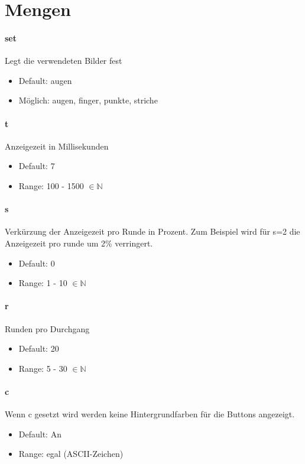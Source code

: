 \documentclass[]{article}
\begin{document}
\section{Mengen}
\begin{multicols}{2}

	\paragraph{set}  Legt die verwendeten Bilder fest
	\begin{itemize}
		\item Default:  augen
		\item Möglich:  augen, finger, punkte, striche
	\end{itemize}

	\paragraph{t} Anzeigezeit in Millisekunden

	\begin{itemize}
		\item Default:  7
		\item Range:  100 - 1500 $\in \mathbb{N}$
	\end{itemize}

	\paragraph{s} Verkürzung der Anzeigezeit pro Runde in Prozent. Zum Beispiel wird für s=2 die Anzeigezeit pro runde um 2\% verringert.
	\begin{itemize}
		\item Default:  0
		\item Range:  1 - 10 $\in \mathbb{N}$
	\end{itemize}

	\paragraph{r}  Runden pro Durchgang
	\begin{itemize}
		\item Default:  20
		\item Range:  5 - 30 $\in \mathbb{N}$
	\end{itemize}

	\paragraph{c}  Wenn c gesetzt wird werden keine Hintergrundfarben für die Buttons angezeigt.
	\begin{itemize}
		\item Default:  An
		\item Range:  egal (ASCII-Zeichen)
	\end{itemize}


\end{multicols}
\end{document}
